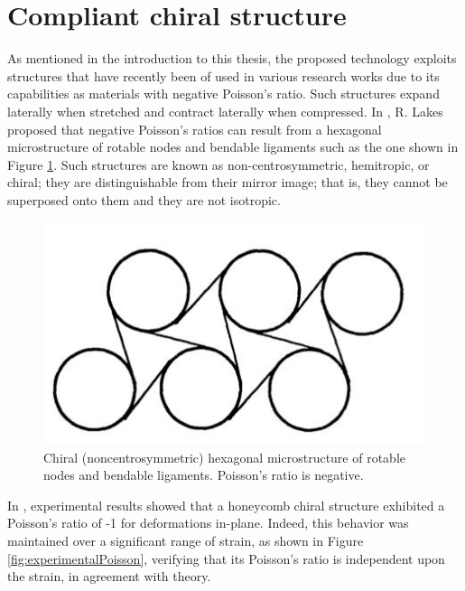 \clearpage
\section{Compliant chiral structure} \label{sec:chiral_state}

  As mentioned in the introduction to this thesis, the proposed technology exploits structures that have recently been of used in various research works due to its capabilities as materials with negative Poisson's ratio. Such structures expand laterally when stretched and contract laterally when compressed. In \cite{Lakes1991}, R. Lakes proposed that negative Poisson's ratios can result from a hexagonal microstructure of rotable nodes and bendable ligaments such as the one shown in Figure \ref{fig:chiral}. Such structures are known as non-centrosymmetric, hemitropic, or chiral; they are distinguishable from their mirror image; that is, they cannot be superposed onto them and they are not isotropic.

  \begin{figure}[!htpb]
    \centering
    \includegraphics[width=0.6 \textwidth]{figures/state-of-the-art/chiral}
    \caption[Chiral structure of rotable nodes and bendable ligaments]{Chiral (noncentrosymmetric) hexagonal microstructure of rotable nodes and bendable ligaments. Poisson's ratio is negative. \cite{Lakes1991}}\label{fig:chiral}
  \end{figure}

  In \cite{Prall1997}, experimental results showed that a honeycomb chiral structure exhibited a Poisson's ratio of -1 for deformations in-plane. Indeed, this behavior was maintained over a significant range of strain, as shown in Figure \ref{fig:experimentalPoisson}, verifying that its Poisson's ratio is independent upon the strain, in agreement with theory. 

